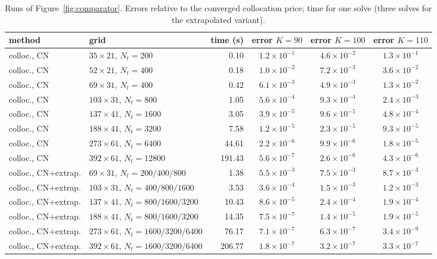 \begin{table}[h]
\centering
\caption{Runs of Figure~\ref{fig:comparator}. Errors relative to the converged collocation price;
time for one solve (three solves for the extrapolated variant).}
\label{tab:comp}
\footnotesize\setlength{\tabcolsep}{4pt}
\begin{tabular}{llrccc}
\toprule
method & grid & time (s) & error $K=90$ & error $K=100$ & error $K=110$\\
\midrule
colloc., CN & $35\times21$, $N_t=200$ & 0.10 & $1.2\times10^{-1}$ & $4.6\times10^{-2}$ & $1.3\times10^{-1}$\\
colloc., CN & $52\times21$, $N_t=400$ & 0.18 & $1.0\times10^{-2}$ & $7.2\times10^{-3}$ & $3.6\times10^{-2}$\\
colloc., CN & $69\times31$, $N_t=400$ & 0.42 & $6.1\times10^{-3}$ & $4.9\times10^{-3}$ & $1.3\times10^{-2}$\\
colloc., CN & $103\times31$, $N_t=800$ & 1.05 & $5.6\times10^{-4}$ & $9.3\times10^{-4}$ & $2.4\times10^{-3}$\\
colloc., CN & $137\times41$, $N_t=1600$ & 3.05 & $3.9\times10^{-5}$ & $9.6\times10^{-5}$ & $4.8\times10^{-4}$\\
colloc., CN & $188\times41$, $N_t=3200$ & 7.58 & $1.2\times10^{-5}$ & $2.3\times10^{-5}$ & $9.3\times10^{-5}$\\
colloc., CN & $273\times61$, $N_t=6400$ & 44.61 & $2.2\times10^{-6}$ & $9.9\times10^{-6}$ & $1.8\times10^{-5}$\\
colloc., CN & $392\times61$, $N_t=12800$ & 191.43 & $5.6\times10^{-7}$ & $2.6\times10^{-6}$ & $4.3\times10^{-6}$\\
\addlinespace[2pt]
colloc., CN+extrap. & $69\times31$, $N_t=200/400/800$ & 1.38 & $5.5\times10^{-3}$ & $7.5\times10^{-3}$ & $8.7\times10^{-3}$\\
colloc., CN+extrap. & $103\times31$, $N_t=400/800/1600$ & 3.53 & $3.6\times10^{-4}$ & $1.5\times10^{-3}$ & $1.2\times10^{-3}$\\
colloc., CN+extrap. & $137\times41$, $N_t=800/1600/3200$ & 10.43 & $8.6\times10^{-5}$ & $2.4\times10^{-4}$ & $1.9\times10^{-4}$\\
colloc., CN+extrap. & $188\times41$, $N_t=800/1600/3200$ & 14.35 & $7.5\times10^{-7}$ & $1.4\times10^{-5}$ & $1.9\times10^{-5}$\\
colloc., CN+extrap. & $273\times61$, $N_t=1600/3200/6400$ & 76.17 & $7.1\times10^{-7}$ & $6.3\times10^{-7}$ & $3.4\times10^{-9}$\\
colloc., CN+extrap. & $392\times61$, $N_t=1600/3200/6400$ & 206.77 & $1.8\times10^{-7}$ & $3.2\times10^{-7}$ & $3.3\times10^{-7}$\\

\end{tabular}
\end{table}
